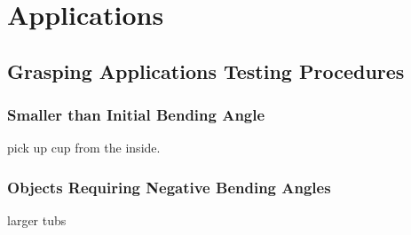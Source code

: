 \chapter{Applications}
\section{Grasping Applications Testing Procedures}
\subsection{Smaller than Initial Bending Angle}
pick up cup from the inside. 
\subsection{Objects Requiring Negative Bending Angles}
larger tubs 